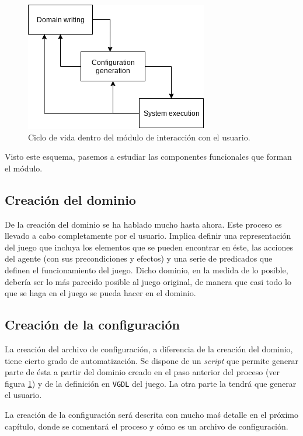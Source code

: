 \begin{figure}[H]
    \centering
    \includegraphics[scale=0.6]{img/CH05/iter_waterfall_model.png}
    \caption{Ciclo de vida dentro del módulo de interacción con el usuario.}
    \label{fig:iterative_waterfall_model}
\end{figure}

Visto este esquema, pasemos a estudiar las componentes funcionales que forman el módulo.

\subsection{Creación del dominio}

De la creación del dominio se ha hablado mucho hasta ahora. Este proceso es llevado a cabo completamente
por el usuario. Implica definir una representación del juego que incluya los elementos que se pueden
encontrar en éste, las acciones del agente (con sus precondiciones y efectos) y una serie de predicados
que definen el funcionamiento del juego. Dicho dominio, en la medida de lo posible, debería ser
lo más parecido posible al juego original, de manera que casi todo lo que se haga en el juego
se pueda hacer en el dominio.

\subsection{Creación de la configuración}

La creación del archivo de configuración, a diferencia de la creación del dominio, tiene cierto grado
de automatización. Se dispone de un \textit{script} que permite generar parte de ésta a partir del
dominio creado en el paso anterior del proceso (ver figura \ref{fig:iterative_waterfall_model}) y
de la definición en \texttt{VGDL} del juego. La otra parte la tendrá que generar el usuario.

La creación de la configuración será descrita con mucho maś detalle en el próximo capítulo,
donde se comentará el proceso y cómo es un archivo de configuración.

